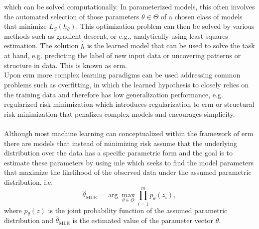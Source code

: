 \begin{tcolorbox}
    which can be solved computationally. In parameterized models, this often involves the automated selection of those parameters $\theta\in\Theta$ of a chosen class of models that minimize $L_{S}(h_\theta)$. This optimization problem can then be solved by various methods such as gradient descent, or e.g., analytically using least squares estimation. The solution $\hat{h}$ is the learned model that can be used to solve the task at hand, e.g. predicting the label of new input data or uncovering patterns or structure in data. This is known as \gls{erm}.\\
    Upon \gls{erm} more complex learning paradigms can be used addressing common problems such as overfitting, in which the learned hypothesis to closely relies on the training data and therefore has low generalization performance, e.g. regularized risk minimization which introduces regularization to \gls{erm} or structural risk minimization that penalizes complex models and encourages simplicity.\\
    \\
    Although most machine learning can conceptualized within the framework of \gls{erm} there are models that instead of minimizing risk assume that the underlying distribution over the data has a specific parametric form and the goal is to estimate these parameters by using \gls{mle} which seeks to find the model parameters that maximize the likelihood of the observed data under the assumed parametric distribution, i.e. \\
    \begin{equation}
    \hat{\theta}_{\text{MLE}} = \arg\max_{\theta\in\Theta}\prod_{i=1}^{m}p_{\theta}(z_i),
    \end{equation}
    where $p_{\theta}(z)$ is the joint probability function of the assumed parametric distribution and $\hat{\theta}_{\text{MLE}}$ is the estimated value of the parameter vector $\theta$.
\end{tcolorbox}

